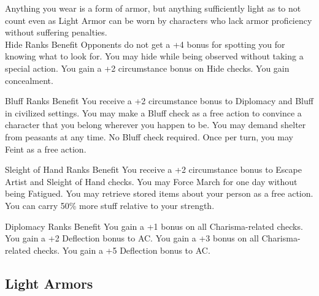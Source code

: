 \begin{multicols}{2}
Anything you wear is a form of armor, but anything sufficiently light as to not count even as Light Armor can be worn by characters who lack armor proficiency without suffering penalties.\\




{Hide Ranks Benefit
}{Opponents do not get a +4 bonus for spotting you for knowing what to look for.
}{You may hide while being observed without taking a special action.
}{You gain a +2 circumstance bonus on Hide checks.
}{You gain concealment.
}


{Bluff Ranks Benefit}
{You receive a +2 circumstance bonus to Diplomacy and Bluff in civilized settings.}
{You may make a Bluff check as a free action to convince a character that you belong wherever you happen to be.}
{You may demand shelter from peasants at any time. No Bluff check required.}
{Once per turn, you may Feint as a free action.}



{Sleight of Hand Ranks Benefit}
{You receive a +2 circumstance bonus to Escape Artist and Sleight of Hand checks.}
{You may Force March for one day without being Fatigued.}
{You may retrieve stored items about your person as a free action.}
{You can carry 50\% more stuff relative to your strength.}



{Diplomacy Ranks Benefit}
{You gain a +1 bonus on all Charisma-related checks.}
{You gain a +2 Deflection bonus to AC.}
{You gain a +3 bonus on all Charisma-related checks.}
{You gain a +5 Deflection bonus to AC.}



\subsection{Light Armors}




\end{multicols}
